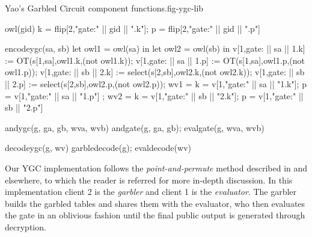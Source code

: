 \begin{fpfig}{Yao's Garbled Circuit component functions.}{fig-ygc-lib}
{\footnotesize
\begin{verbatimtab}
  owl(gid) { { k = flip[2,"gate:" || gid || ".k"]; p = flip[2,"gate:" || gid || ".p"] } }

  encodeygc(sa, sb) {
    let owl1 = owl(sa) in
    let owl2 = owl(sb) in
    v[1,gate: || sa || 1.k] := OT(s[1,sa],owl1.k,(not owl1.k));
    v[1,gate: || sa || 1.p] := OT(s[1,sa],owl1.p,(not owl1.p));
    v[1,gate: || sb || 2.k] := select(s[2,sb],owl2.k,(not owl2.k));
    v[1,gate: || sb || 2.p] := select(s[2,sb],owl2.p,(not owl2.p));
    { wv1 = { k = v[1,"gate:" || sa || "1.k"]; p = v[1,"gate:" || sa || "1.p"] };
      wv2 = { k = v[1,"gate:" || sb || "2.k"]; p = v[1,"gate:" || sb || "2.p"] } }
  }

  andygc(g, ga, gb, wva, wvb) { andgate(g, ga, gb); evalgate(g, wva, wvb) }

  decodeygc(g, wv) { garbledecode(g); evaldecode(wv) }
\end{verbatimtab}
}
\end{fpfig}

Our YGC implementation follows the \emph{point-and-permute} method
described in \cite{evans2018pragmatic} and elsewhere, to which the
reader is referred for more in-depth discussion.  In this
implementation client 2 is the \emph{garbler} and client 1 is the
\emph{evaluator}. The garbler builds the garbled tables and shares
them with the evaluator, who then evaluates the gate in an oblivious
fashion until the final public output is generated through
decryption. 

